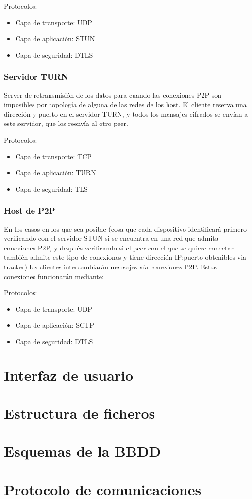 \documentclass{article}
\begin{document}
    Protocolos:
    
    \begin{itemize}
       \item Capa de transporte: UDP
       \item Capa de aplicación: STUN
       \item Capa de seguridad: DTLS
    \end{itemize}
    
    \subsubsection{Servidor TURN}
    Server de retransmisión de los datos para cuando las conexiones P2P son imposibles por topología de alguna de las redes de los host. El cliente reserva una dirección y puerto en el servidor TURN, y todos los mensajes cifrados se envían a este servidor, que los reenvía al otro peer. \vspace{1em}
    
    Protocolos:
    
    \begin{itemize}
       \item Capa de transporte: TCP
       \item Capa de aplicación: TURN
       \item Capa de seguridad: TLS
    \end{itemize}
    
    \subsubsection{Host de P2P}
    En los casos en los que sea posible (cosa que cada dispositivo identificará primero verificando con el servidor STUN si se encuentra en una red que admita conexiones P2P, y después verificando si el peer con el que se quiere conectar también admite este tipo de conexiones y tiene dirección IP:puerto obtenibles via tracker) los clientes intercambiarán mensajes vía conexiones P2P. Estas conexiones funcionarán mediante: \vspace{1em}
    
    Protocolos:
    
    \begin{itemize}
       \item Capa de transporte: UDP
       \item Capa de aplicación: SCTP
       \item Capa de seguridad: DTLS
    \end{itemize}

    \section{Interfaz de usuario}
    \section{Estructura de ficheros}
    \section{Esquemas de la BBDD}
    \section{Protocolo de comunicaciones}
    
\end{document}
